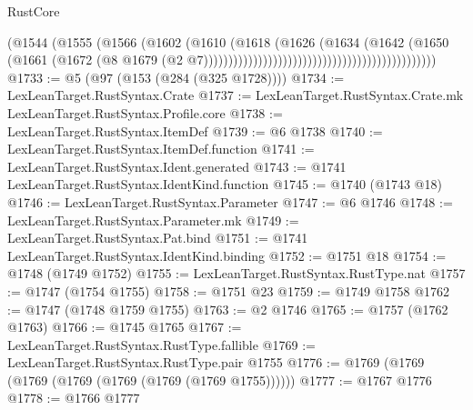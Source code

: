 \begin{lexlean}{RustCore}
\begin{coremodule}
                                                                      (@1544
                                                                        (@1555
                                                                          (@1566
                                                                            (@1602
                                                                              (@1610
                                                                                (@1618
                                                                                  (@1626
                                                                                    (@1634
                                                                                      (@1642
                                                                                        (@1650
                                                                                          (@1661
                                                                                            (@1672
                                                                                              (@8
                                                                                                @1679
                                                                                                (@2
                                                                                                  @7)))))))))))))))))))))))))))))))))))))))))))))))
@1733 := @5 (@97 (@153 (@284 (@325 @1728))))
@1734 := LexLeanTarget.RustSyntax.Crate
@1737 := LexLeanTarget.RustSyntax.Crate.mk LexLeanTarget.RustSyntax.Profile.core
@1738 := LexLeanTarget.RustSyntax.ItemDef
@1739 := @6 @1738
@1740 := LexLeanTarget.RustSyntax.ItemDef.function
@1741 := LexLeanTarget.RustSyntax.Ident.generated
@1743 := @1741 LexLeanTarget.RustSyntax.IdentKind.function
@1745 := @1740 (@1743 @18)
@1746 := LexLeanTarget.RustSyntax.Parameter
@1747 := @6 @1746
@1748 := LexLeanTarget.RustSyntax.Parameter.mk
@1749 := LexLeanTarget.RustSyntax.Pat.bind
@1751 := @1741 LexLeanTarget.RustSyntax.IdentKind.binding
@1752 := @1751 @18
@1754 := @1748 (@1749 @1752)
@1755 := LexLeanTarget.RustSyntax.RustType.nat
@1757 := @1747 (@1754 @1755)
@1758 := @1751 @23
@1759 := @1749 @1758
@1762 := @1747 (@1748 @1759 @1755)
@1763 := @2 @1746
@1765 := @1757 (@1762 @1763)
@1766 := @1745 @1765
@1767 := LexLeanTarget.RustSyntax.RustType.fallible
@1769 := LexLeanTarget.RustSyntax.RustType.pair @1755
@1776 := @1769 (@1769 (@1769 (@1769 (@1769 (@1769 (@1769 @1755))))))
@1777 := @1767 @1776
@1778 := @1766 @1777

\end{coremodule}
\end{lexlean}
